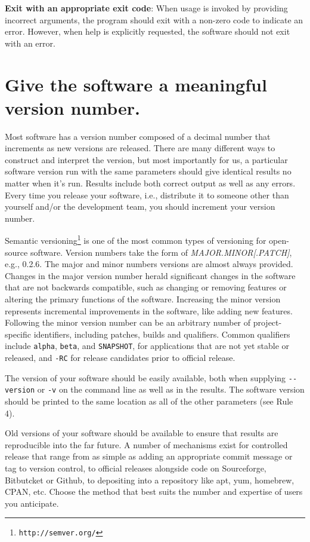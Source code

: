 \documentclass[10pt]{article}
\newcommand{\withurl}[2]{{#1}\footnote{\texttt{#2}}}
\begin{document}
\textbf{Exit with an appropriate exit code}: When usage is invoked by
providing incorrect arguments, the program should exit with a non-zero
code to indicate an error. However, when help is explicitly requested,
the software should not exit with an error.

\section{Give the software a meaningful version number.}

Most software has a version number composed of a decimal number that
increments as new versions are released. There are many different ways
to construct and interpret the version, but most importantly for us, a
particular software version run with the same parameters should give
identical results no matter when it's run. Results include both correct
output as well as any errors.
Every time you release your software, i.e., distribute it to
someone other than yourself and/or the development team, you should
increment your version number.

\withurl{Semantic versioning}{http://semver.org/} is one of the most common
types of versioning for open-source software. Version numbers take the
form of \emph{MAJOR.MINOR{[}.PATCH{]}}, e.g., 0.2.6. The major and
minor numbers versions are almost always provided. Changes in the major
version number herald significant changes in the software that are not
backwards compatible, such as changing or removing features or altering
the primary functions of the software. Increasing the minor version
represents incremental improvements in the software, like adding new
features. Following the minor version number can be an arbitrary number
of project-specific identifiers, including patches, builds and qualifiers.
Common qualifiers include \texttt{alpha}, \texttt{beta}, and \texttt{SNAPSHOT},
for applications that are
not yet stable or released, and \texttt{-RC} for release candidates prior
to official release.

The version of your software should be easily available, both when
supplying \texttt{-\/-version} or \texttt{-v} on the command line as
well as in the results. The software version should be printed to the
same location as all of the other parameters (see Rule 4).

Old versions of your software should be available to ensure that results
are reproducible into the far future. A number of mechanisms exist for
controlled release that range from as simple as adding an appropriate
commit message or tag to version control, to official releases alongside
code on Sourceforge, Bitbutcket or Github, to depositing into a
repository like apt, yum, homebrew, CPAN, etc. Choose the method that
best suits the number and expertise of users you anticipate.
\end{document}
